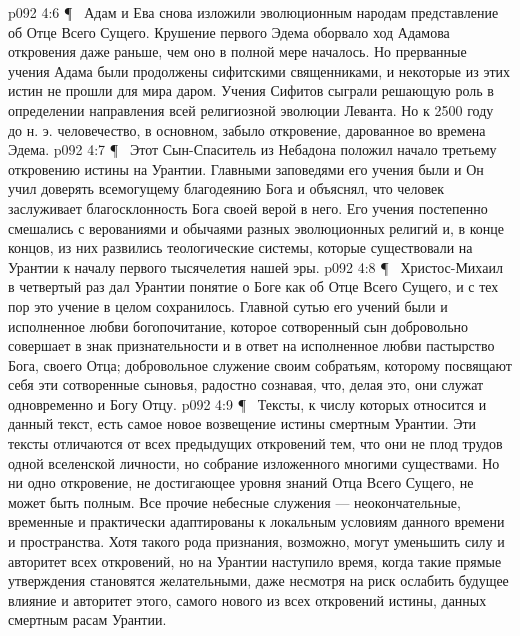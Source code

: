 \vs p092 4:6 \P\ \bibnobreakspace {} Адам и Ева снова изложили эволюционным народам представление об Отце Всего Сущего. Крушение первого Эдема оборвало ход Адамова откровения даже раньше, чем оно в полной мере началось. Но прерванные учения Адама были продолжены сифитскими священниками, и некоторые из этих истин не прошли для мира даром. Учения Сифитов сыграли решающую роль в определении направления всей религиозной эволюции Леванта. Но к 2500 году до н. э. человечество, в основном, забыло откровение, дарованное во времена Эдема.
\vs p092 4:7 \P\ \bibnobreakspace {} Этот Сын\hyp{}Спаситель из Небадона положил начало третьему откровению истины на Урантии. Главными заповедями его учения были  и  Он учил доверять всемогущему благодеянию Бога и объяснял, что человек заслуживает благосклонность Бога своей верой в него. Его учения постепенно смешались с верованиями и обычаями разных эволюционных религий и, в конце концов, из них развились теологические системы, которые существовали на Урантии к началу первого тысячелетия нашей эры.
\vs p092 4:8 \P\ \bibnobreakspace {} Христос\hyp{}Михаил в четвертый раз дал Урантии понятие о Боге как об Отце Всего Сущего, и с тех пор это учение в целом сохранилось. Главной сутью его учений были  и  исполненное любви богопочитание, которое сотворенный сын добровольно совершает в знак признательности и в ответ на исполненное любви пастырство Бога, своего Отца; добровольное служение своим собратьям, которому посвящают себя эти сотворенные сыновья, радостно сознавая, что, делая это, они служат одновременно и Богу Отцу.
\vs p092 4:9 \P\ \bibnobreakspace {} Тексты, к числу которых относится и данный текст, есть самое новое возвещение истины смертным Урантии. Эти тексты отличаются от всех предыдущих откровений тем, что они не плод трудов одной вселенской личности, но собрание изложенного многими существами. Но ни одно откровение, не достигающее уровня знаний Отца Всего Сущего, не может быть полным. Все прочие небесные служения --- неокончательные, временные и практически адаптированы к локальным условиям данного времени и пространства. Хотя такого рода признания, возможно, могут уменьшить силу и авторитет всех откровений, но на Урантии наступило время, когда такие прямые утверждения становятся желательными, даже несмотря на риск ослабить будущее влияние и авторитет этого, самого нового из всех откровений истины, данных смертным расам Урантии.
